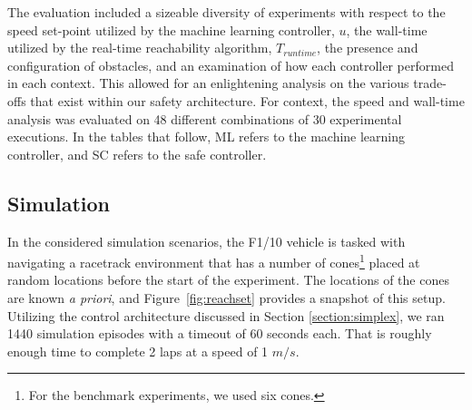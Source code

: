 \documentclass[manuscript,screen,review]{acmart}
\newcommand{\figref}[1]{Figure~\ref{#1}}
\begin{document}
The evaluation included a sizeable diversity of experiments with respect to the speed set-point utilized by the machine learning controller, $u$, the wall-time utilized by the real-time reachability algorithm, $T_{runtime}$, the presence and configuration of obstacles, and an examination of how each controller performed in each context. This allowed for an enlightening analysis on the various trade-offs that exist within our safety architecture. For context, the speed and wall-time analysis was evaluated on 48 different combinations of 30 experimental executions. %
In the tables that follow, ML refers to the machine learning controller, and SC refers to the safe controller. %

\subsection{Simulation}
In the considered simulation scenarios, the F1/10 vehicle is tasked with navigating a racetrack environment that has a number of cones\footnote{For the benchmark experiments, we used six cones.} placed at random locations before the start of the experiment. The locations of the cones are known \emph{a priori}, and \figref{fig:reachset} provides a snapshot of this setup. Utilizing the control architecture discussed in Section \ref{section:simplex}, we ran 1440 simulation episodes with a timeout of 60 seconds each. That is roughly enough time to complete 2 laps at a speed of 1 $m/s$. %
\end{document}
